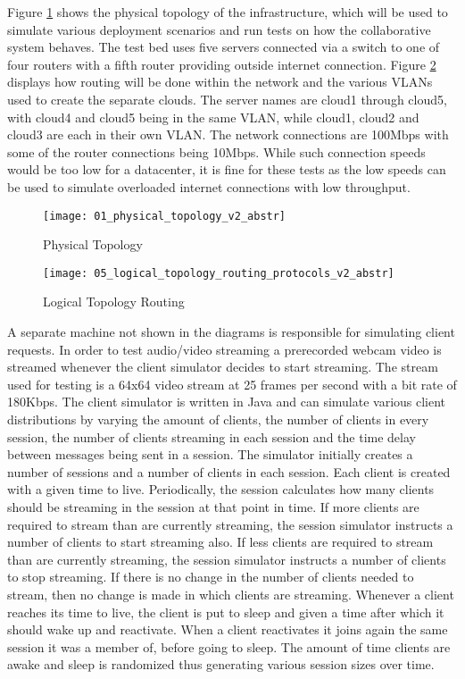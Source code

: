 Figure \ref{fig:deployment} shows the physical topology of the infrastructure, which will be used to simulate various deployment scenarios and run tests on how the collaborative system behaves. The test bed uses five servers connected via a switch to one of four routers with a fifth router providing outside internet connection. Figure \ref{fig:logicaldeploymentrouting} displays how routing will be done within the network and the various VLANs used to create the separate clouds. The server names are cloud1 through cloud5, with cloud4 and cloud5 being in the same VLAN, while cloud1, cloud2 and cloud3 are each in their own VLAN. The network connections are 100Mbps with some of the router connections being 10Mbps. While such connection speeds would be too low for a datacenter, it is fine for these tests as the low speeds can be used to simulate overloaded internet connections with low throughput.

\begin{figure}
	\centering
		\texttt{[image: 01\_physical\_topology\_v2\_abstr]}
	\caption{Physical Topology}
	\label{fig:deployment}
\end{figure}

\begin{figure}
	\centering
		\texttt{[image: 05\_logical\_topology\_routing\_protocols\_v2\_abstr]}
	\caption{Logical Topology Routing}
	\label{fig:logicaldeploymentrouting}
\end{figure}

A separate machine not shown in the diagrams is responsible for simulating client requests. In order to test audio/video streaming a prerecorded webcam video is streamed whenever the client simulator decides to start streaming. The stream used for testing is a 64x64 video stream at 25 frames per second with a bit rate of 180Kbps. The client simulator is written in Java and can simulate various client distributions by varying the amount of clients, the number of clients in every session, the number of clients streaming in each session and the time delay between messages being sent in a session. The simulator initially creates a number of sessions and a number of clients in each session. Each client is created with a given time to live. Periodically, the session calculates how many clients should be streaming in the session at that point in time. If more clients are required to stream than are currently streaming, the session simulator instructs a number of clients to start streaming also. If less clients are required to stream than are currently streaming, the session simulator instructs a number of clients to stop streaming. If there is no change in the number of clients needed to stream, then no change is made in which clients are streaming. Whenever a client reaches its time to live, the client is put to sleep and given a time after which it should wake up and reactivate. When a client reactivates it joins again the same session it was a member of, before going to sleep. The amount of time clients are awake and sleep is randomized thus generating various session sizes over time.

